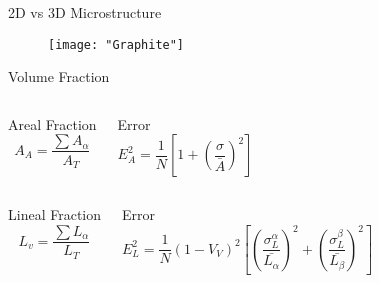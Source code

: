 \documentclass[10pt]{beamer}
\begin{document}
{%
\begin{frame}[fragile]{2D vs 3D Microstructure}

\begin{figure}[H]
\texttt{[image: "Graphite"]}

\end{figure}
    
\end{frame}
}
{%
\begin{frame}[fragile]{Volume Fraction}



  \begin{columns}[T,onlytextwidth]
 
\begin{block}{Areal Fraction}
\begin{equation*}
A_{A} = \dfrac{\sum A_{\alpha}}{A_{T}}
\end{equation*} 
\end{block}
 

\begin{block}{Error}
\begin{equation*}
E_{A}^{2} = \dfrac{1}{N}\left[ 1+ \left( \dfrac{\sigma}{\bar{A}} \right)^{2} \right]
\end{equation*} 
\end{block}

\end{columns}

  \begin{columns}[T,onlytextwidth]
\begin{block}{Lineal Fraction}
\begin{equation*}
L_{v} = \dfrac{\sum L_{\alpha}}{L_{T}}
\end{equation*} 
\end{block}
 

\begin{block}{Error}
\small
\begin{equation*}
E_{L}^{2} = \dfrac{1}{N}(1-V_{V})^{2}\left[ \left( \dfrac{\sigma^{\alpha}_{L}}{\bar{L_{\alpha}}} \right)^{2} + \left( \dfrac{\sigma^{\beta}_{L}}{\bar{L_{\beta}}} \right)^{2} \right]
\end{equation*}


\end{block}
\end{columns}
\end{frame}}
\end{document}
